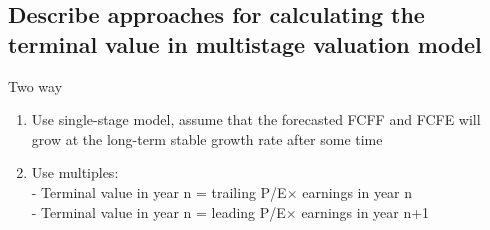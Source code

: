 \documentclass{article}
\newcommand{\be}{\begin{enumerate}}
\newcommand{\ee}{\end{enumerate}}
\begin{document}
\subsection{Describe approaches for calculating the terminal value in multistage valuation model}
Two way
\be
    \item Use single-stage model, assume that the forecasted FCFF and FCFE will grow at
        the long-term stable growth rate after some time
    \item Use multiples: 
        \\- Terminal value in year n = trailing P/E$\times$ earnings in year n
        \\- Terminal value in year n = leading P/E$\times$ earnings in year n+1
\ee
\end{document}
